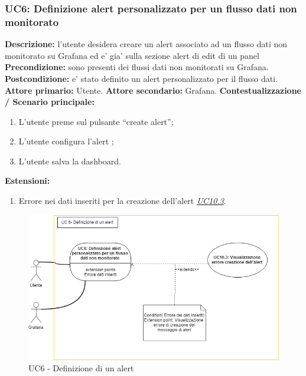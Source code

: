                 \subsubsection{UC6: Definizione alert personalizzato per un flusso dati non monitorato}
                    \textbf{Descrizione:} l’utente desidera creare un alert associato ad un flusso dati non monitorato su Grafana ed e’ gia’ sulla sezione alert di edit di un panel
                    \newline
                    \textbf{Precondizione:} sono presenti dei flussi dati non monitorati su Grafana.
                    \newline
                    \textbf{Postcondizione:} e’ stato definito un alert personalizzato per il flusso dati.
                    \newline
                    \textbf{Attore primario:} Utente.
                    \newline
                    \textbf{Attore secondario:} Grafana.
                    \newline
                    \textbf{Contestualizzazione / Scenario principale:} \begin{enumerate}
                            \item L’utente preme sul pulsante “create alert”;
                            \item L’utente configura l’alert ;
                            \item L’utente salva la dashboard.
                        \end{enumerate}
                    
                    \textbf{Estensioni:} 
                    \begin{enumerate}
                            \item Errore nei dati inseriti per la creazione dell'alert \underline{\textit{UC10.3}}.
                        \end{enumerate}
                
                		\begin{figure}[!htbp]
		                	\centering
		                	\includegraphics[width=\textwidth]{UC6.png}
		                	\caption{UC6 - Definizione di un alert}
		                \end{figure}
	                	\clearpage
                
